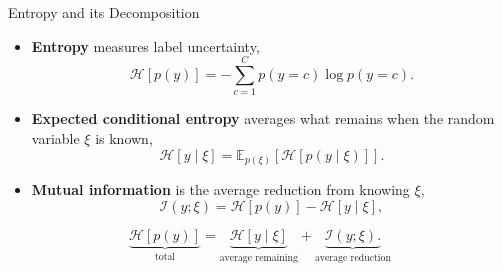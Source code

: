     
\begin{frame}{Entropy and its Decomposition}
\label{frm:backup-entropy-decomposition}
\setlength{\abovedisplayskip}{4pt}
\setlength{\belowdisplayskip}{4pt}
\begin{itemize}
\setlength{\itemsep}{5mm}
\item \textbf{Entropy} measures label uncertainty,
\[
\mathcal H[p(y)]=-\sum_{c=1}^{C}p(y=c)\log p(y=c).
\]
\item \textbf{Expected conditional entropy} averages what remains when the random variable $\xi$ is known,
\[
\mathcal H[y\mid\xi]=\mathbb E_{p(\xi)}\!\left[\mathcal H[p(y\mid\xi)]\right].
\]
\item \textbf{Mutual information} is the average reduction from knowing $\xi$,
\[
\mathcal I(y;\xi)=\mathcal H[p(y)]-\mathcal H[y\mid\xi],
\]
\end{itemize}
\[
\underbrace{\mathcal H[p(y)]}_{\text{total}}
=\underbrace{\mathcal H[y\mid\xi]}_{\text{average remaining}}
+\underbrace{\mathcal I(y;\xi).}_{\text{average reduction}}
\]
\end{frame}

